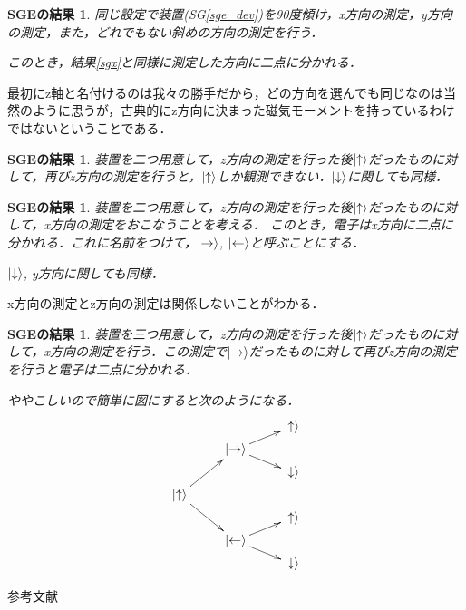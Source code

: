 \documentclass[dvipdfmx]{beamer}
\theoremstyle{break}
\newtheorem{result}[thm]{SGEの結果}
\newcommand{\up}{\ket{\uparrow}}
\newcommand{\down}{\ket{\downarrow}}
\begin{document}
\begin{frame}[allowframebreaks]
		\begin{result}
				同じ設定で装置(SG\ref{sge_dev})を90度傾け，x方向の測定，y方向の測定，また，どれでもない斜めの方向の測定を行う．
				
				このとき，結果\ref{sgx}と同様に測定した方向に二点に分かれる．
		\end{result}
		最初にz軸と名付けるのは我々の勝手だから，どの方向を選んでも同じなのは当然のように思うが，古典的にz方向に決まった磁気モーメントを持っているわけではないということである．
		\begin{result}
				装置を二つ用意して，z方向の測定を行った後$\up$だったものに対して，再びz方向の測定を行うと，$\up$しか観測できない．$\down$に関しても同様．
		\end{result}
		\begin{result}
				装置を二つ用意して，z方向の測定を行った後$\up$だったものに対して，x方向の測定をおこなうことを考える．
				このとき，電子はx方向に二点に分かれる．これに名前をつけて，$\ket{\rightarrow}$, $\ket{\leftarrow}$と呼ぶことにする．

				$\down$, y方向に関しても同様．
		\end{result}
		x方向の測定とz方向の測定は関係しないことがわかる．

		\begin{result}
				装置を三つ用意して，z方向の測定を行った後$\up$だったものに対して，x方向の測定を行う．この測定で$\ket{\rightarrow}$だったものに対して再びz方向の測定を行うと電子は二点に分かれる．

				ややこしいので簡単に図にすると次のようになる．
		\begin{align*}
				\xymatrix@R=2pt{
						& & \up\\
						&\ket{\rightarrow}\ar[ru]\ar[rd] & \\
						& & \down\\
						\up\ar[rdd]\ar[ruu] & & \\
						& & \up\\
						&\ket{\leftarrow}\ar[ru]\ar[rd] & \\
						& & \down
				}
		\end{align*}
		\end{result}
\end{frame}
\begin{frame}[allowframebreaks]{参考文献}
		\beamertemplatetextbibitems
		
		
\end{frame}
\end{document}
